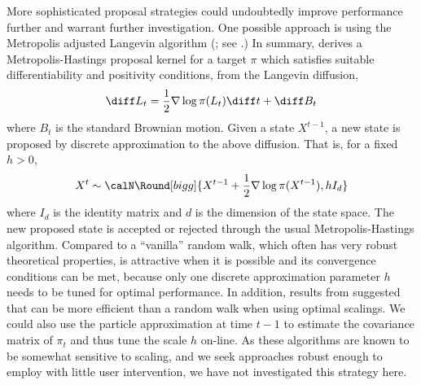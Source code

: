 More sophisticated proposal strategies could undoubtedly improve performance
further and warrant further investigation. One possible approach is using the
Metropolis adjusted Langevin algorithm (\mala; see \cite{Roberts:1996vd}.) In
summary, \mala derives a Metropolis-Hastings proposal kernel for a target
$\pi$ which satisfies suitable differentiability and positivity conditions,
from the Langevin diffusion,
\begin{equation*}
  \diff L_t = \frac{1}{2}\nabla\log\pi(L_t)\diff t + \diff B_t
\end{equation*}
where $B_t$ is the standard Brownian motion. Given a state $X^{t-1}$, a new
state is proposed by discrete approximation to the above diffusion. That is,
for a fixed $h>0$,
\begin{equation}
  X^t\sim\calN\Round[bigg]{X^{t-1}+\frac{1}{2}\nabla\log\pi(X^{t-1}), hI_d}
\end{equation}
where $I_d$ is the identity matrix and $d$ is the dimension of the state
space. The new proposed state is accepted or rejected through the usual
Metropolis-Hastings algorithm. Compared to a ``vanilla'' random walk, which
often has very robust theoretical properties, \mala is attractive when it is
possible and its convergence conditions \cite{Roberts:1996vd} can be met,
because only one discrete approximation parameter $h$ needs to be tuned for
optimal performance. In addition, results from \cite{Roberts:2001ta} suggested
that \mala can be more efficient than a random walk when using optimal
scalings. We could also use the particle approximation at time $t - 1$ to
estimate the covariance matrix of $\pi_t$ and thus tune the scale $h$ on-line.
As these algorithms are known to be somewhat sensitive to scaling, and we seek
approaches robust enough to employ with little user intervention, we have not
investigated this strategy here.




